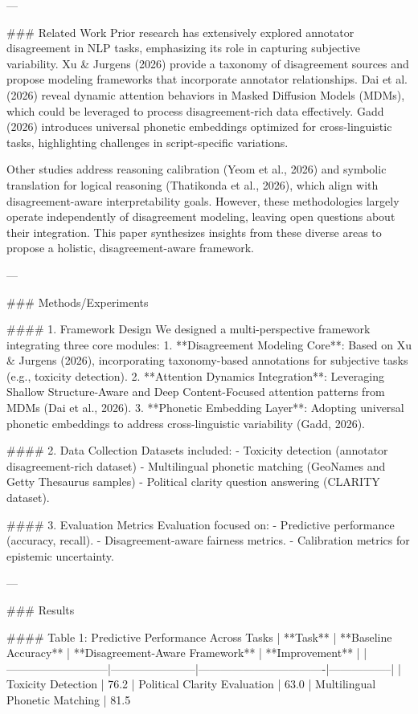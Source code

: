 ---

### Related Work  
Prior research has extensively explored annotator disagreement in NLP tasks, emphasizing its role in capturing subjective variability. Xu & Jurgens (2026) provide a taxonomy of disagreement sources and propose modeling frameworks that incorporate annotator relationships. Dai et al. (2026) reveal dynamic attention behaviors in Masked Diffusion Models (MDMs), which could be leveraged to process disagreement-rich data effectively. Gadd (2026) introduces universal phonetic embeddings optimized for cross-linguistic tasks, highlighting challenges in script-specific variations.

Other studies address reasoning calibration (Yeom et al., 2026) and symbolic translation for logical reasoning (Thatikonda et al., 2026), which align with disagreement-aware interpretability goals. However, these methodologies largely operate independently of disagreement modeling, leaving open questions about their integration. This paper synthesizes insights from these diverse areas to propose a holistic, disagreement-aware framework.

---

### Methods/Experiments  

#### 1. Framework Design  
We designed a multi-perspective framework integrating three core modules:  
1. **Disagreement Modeling Core**: Based on Xu & Jurgens (2026), incorporating taxonomy-based annotations for subjective tasks (e.g., toxicity detection).  
2. **Attention Dynamics Integration**: Leveraging Shallow Structure-Aware and Deep Content-Focused attention patterns from MDMs (Dai et al., 2026).  
3. **Phonetic Embedding Layer**: Adopting universal phonetic embeddings to address cross-linguistic variability (Gadd, 2026).  

#### 2. Data Collection  
Datasets included:  
- Toxicity detection (annotator disagreement-rich dataset)  
- Multilingual phonetic matching (GeoNames and Getty Thesaurus samples)  
- Political clarity question answering (CLARITY dataset).  

#### 3. Evaluation Metrics  
Evaluation focused on:  
- Predictive performance (accuracy, recall).  
- Disagreement-aware fairness metrics.  
- Calibration metrics for epistemic uncertainty.  

---

### Results  

#### Table 1: Predictive Performance Across Tasks  
| **Task**                  | **Baseline Accuracy** | **Disagreement-Aware Framework** | **Improvement** |  
|---------------------------|-----------------------|----------------------------------|-----------------|  
| Toxicity Detection        | 76.2%
| Political Clarity Evaluation | 63.0%
| Multilingual Phonetic Matching | 81.5%

